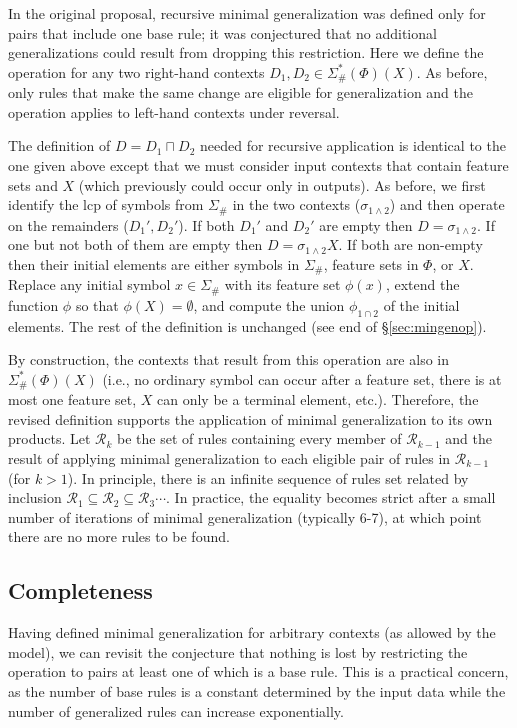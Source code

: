 \documentclass[11pt]{article}
\begin{document}
In the original proposal, recursive minimal generalization was defined only for pairs that include one base rule; it was conjectured that no additional generalizations could result from dropping this restriction. Here we define the operation for any two right-hand contexts $D_1, D_2 \in \Sigma_{\#}^*(\Phi)(X)$. As before, only rules that make the same change are eligible for generalization and the operation applies to left-hand contexts under reversal.

The definition of $D = D_1 \sqcap D_2$ needed for recursive application is identical to the one given above except that we must consider input contexts that contain feature sets and $X$ (which previously could occur only in outputs). As before, we first identify the lcp of symbols from $\Sigma_{\#}$ in the two contexts ($\sigma_{1\land 2}$) and then operate on the remainders ($D_1', D_2'$). If both $D_1'$ and $D_2'$ are empty then $D = \sigma_{1\land2}$. If one but not both of them are empty then $D = \sigma_{1\land2}X$. If both are non-empty then their initial elements are either symbols in $\Sigma_{\#}$, feature sets in $\Phi$, or $X$. Replace any initial symbol $x \in \Sigma_{\#}$ with its feature set $\phi(x)$, extend the function $\phi$ so that $\phi(X) = \emptyset$, and compute the union $\phi_{1\cap2}$ of the initial elements. The rest of the definition is unchanged (see end of \S\ref{sec:mingenop}). 

By construction, the contexts that result from this operation are also in $\Sigma_{\#}^*(\Phi)(X)$ (i.e., no ordinary symbol can occur after a feature set, there is at most one feature set, $X$ can only be a terminal element, etc.). Therefore, the revised definition supports the application of minimal generalization to its own products. Let $\mathcal{R}_{k}$ be the set of rules containing every member of $\mathcal{R}_{k-1}$ and the result of applying minimal generalization to each eligible pair of rules in $\mathcal{R}_{k-1}$ (for $k > 1$). In principle, there is an infinite sequence of rules set related by inclusion $\mathcal{R}_1 \subseteq \mathcal{R}_2 \subseteq \mathcal{R}_3 \cdots$. In practice, the equality becomes strict after a small number of iterations of minimal generalization (typically 6-7), at which point there are no more rules to be found.

\subsection{Completeness}

Having defined minimal generalization for arbitrary contexts (as allowed by the model), we can revisit the conjecture that nothing is lost by restricting the operation to pairs at least one of which is a base rule. This is a practical concern, as the number of base rules is a constant determined by the input data while the number of generalized rules can increase exponentially.
\end{document}

